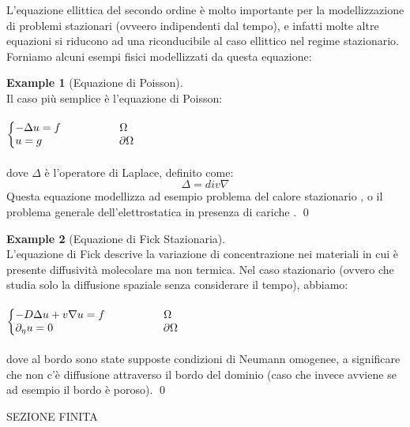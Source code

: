 \documentclass[12pt,a4paper]{report}
\makeatletter
\theoremstyle{theorem}
\theoremstyle{definition}
\newtheorem{example}{Example}
\newenvironment{system}
{\left\lbrace\begin{array}{@{}l@{}}}
{\end{array}\right.}
\makeatother
\begin{document}
L'equazione ellittica del secondo ordine è molto importante per la modellizzazione di problemi stazionari (ovveero indipendenti dal tempo), e infatti molte altre equazioni si riducono ad una riconducibile al caso ellittico nel regime stazionario. Forniamo alcuni esempi fisici modellizzati da questa equazione:
\begin{example} [Equazione di Poisson]
\hfill \\
Il caso più semplice è l'equazione di Poisson:\\\\
\begin{math}
\begin{system}
- \Delta u = f \qquad \qquad \quad \ \Omega \\
u = g \qquad \qquad \qquad \quad \partial \Omega \\
\end{system}
\end{math}
\hfill \\\\
dove $\Delta$ è l'operatore di Laplace, definito come:
\[ \Delta = div \nabla \]
Questa equazione modellizza ad esempio problema del calore stazionario \cite{MNV1}, \cite{Salsa} o il problema generale dell'elettrostatica in presenza di cariche \cite{MNV2}.
\qed
\end{example}
\begin{example} [Equazione di Fick Stazionaria]
\hfill \\
L'equazione di Fick descrive la variazione di concentrazione nei materiali in cui è presente diffusività molecolare ma non termica. Nel caso stazionario (ovvero che studia solo la diffusione spaziale senza considerare il tempo), abbiamo:\\\\
\begin{math}
\begin{system}
- D\Delta u + v \nabla u = f \qquad \qquad \quad \ \Omega \\
\partial_{\eta} u = 0 \quad \qquad \qquad \qquad \qquad \quad \partial \Omega \\
\end{system}
\end{math}
\hfill \\\\
dove al bordo sono state supposte condizioni di Neumann omogenee, a significare che non c'è diffusione attraverso il bordo del dominio (caso che invece avviene se ad esempio il bordo è poroso).
\qed
\end{example}
{ \color{blue} SEZIONE FINITA\\}
\end{document}
